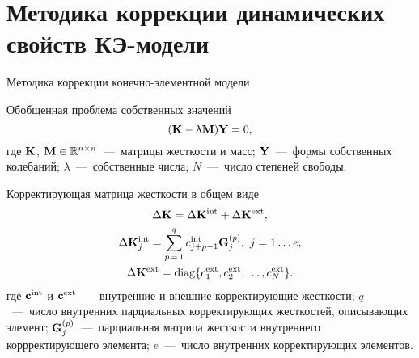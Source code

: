 \section{Методика коррекции динамических свойств КЭ-модели}

\begin{frame}{Методика коррекции конечно-элементной модели}
	\begin{block}{Обобщенная проблема собственных значений}
		\begin{equation}
			(\mathbf{K} - \uplambda \mathbf{M}) \mathbf{Y} = 0,
		\end{equation}
		где $ \mathbf{K} $, $ \mathbf{M} \in \mathbb{R} ^ {n \times n}$~---~матрицы жесткости и масс; $ \mathbf{Y} $~---~формы собственных колебаний; $ \lambda $~---~собственные числа; $ N $~---~число степеней свободы.
	\end{block}
	\begin{block}{Корректирующая матрица жесткости в общем виде}
 		\begin{equation}
 			\begin{gathered}
 				\Delta \mathbf{K} = \Delta \mathbf{K} ^ {\text{int}} + \Delta \mathbf{K} ^ {\text{ext}}, \\
				\Delta \mathbf{K} ^ {\text{int}}_j = \sum\limits_{p\,=\,1}^{q} c ^ {\text{int}}_{j+p-1} \mathbf{G}_j^{(p)}, \ j = 1 \hdots e, \\
				\Delta \mathbf{K} ^ {\text{ext}} = \operatorname{diag} \{ c ^ {\text{ext}}_1, c ^ {\text{ext}}_2, \hdots, c ^ {\text{ext}}_N \}.
			\end{gathered}
		\end{equation}
		где $ \mathbf{c} ^ {\text{int}} $ и $ \mathbf{c} ^ {\text{ext}} $~---~внутренние и внешние корректирующие жесткости; $ q $~---~число внутренних парциальных корректирующих жесткостей, описывающих элемент; $ \mathbf{G}_j^{(p)} $~---~парциальная матрица жесткости внутреннего коррректирующего элемента; $ e $~---~число внутренних корректирующих элементов.
	\end{block}
\end{frame}

